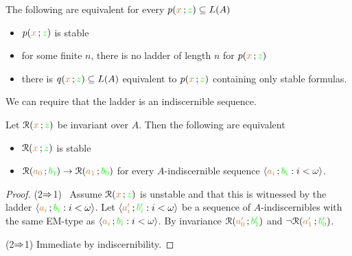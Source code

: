 \begin{fact}\label{}
  The following are equivalent for every $p({\color{brown} x}\,;{\color{green} z})\subseteq L(A)$
  \begin{itemize}
    \item [1.] $p({\color{brown} x}\,;{\color{green} z})$ is stable
    \item [1.] for some finite $n$, there is no ladder of length $n$ for $p({\color{brown} x}\,;{\color{green} z})$
    \item [2.] there is $q({\color{brown} x}\,;{\color{green} z})\subseteq L(A)$ equivalent to $p({\color{brown} x}\,;{\color{green} z})$ containing only stable formulas.
  \end{itemize}
\end{fact}

We can require that the ladder is an indiscernible sequence. 

\begin{theorem}\label{thm_sability_indiscernibility}
  Let $\EuScript R({\color{brown} x}\,;{\color{green} z})$ be invariant over $A$.
  Then the following are equivalent
  \begin{itemize}
    \item[1.] $\EuScript R({\color{brown} x}\,;{\color{green} z})$ is stable
    \item[2.] $\EuScript R({\color{brown} a_0}\,;{\color{green} b_1})\rightarrow\EuScript R({\color{brown} a_1}\,;{\color{green} b_0})$ for every $A$-indiscernible sequence $\langle{\color{brown}a_i}\,;{\color{green} b_i} : i<\omega\rangle$.
  \end{itemize}
\end{theorem}

\begin{proof}
  (2$\Rightarrow$1) \ Assume $\EuScript R({\color{brown} x}\,;{\color{green} z})$ is unstable and that this is witnessed by the ladder $\langle{\color{brown}a_i}\,;{\color{green} b_i} : i<\omega\rangle$.
  Let $\langle{\color{brown}a'_i}\,;{\color{green} b'_i} : i<\omega\rangle$ be a sequence of $A$-indiscernibles with the same EM-type as $\langle{\color{brown}a_i}\,;{\color{green} b_i} : i<\omega\rangle$.
  By invariance $\EuScript R({\color{brown} a'_0}\,;{\color{green} b'_1})$ and $\neg\EuScript R({\color{brown} a'_1}\,;{\color{green} b'_0})$.

  (2$\Rightarrow$1) Immediate by indiscernibility.
\end{proof}


